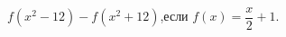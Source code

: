 \begin{ex}[type=calculate_expression]
	\begin{condition}
		\( f(x^2-12)-f(x^2+12) \),\quad если \( f(x)=\dfrac{x}{2}+1 \).
	\end{condition}
\end{ex}